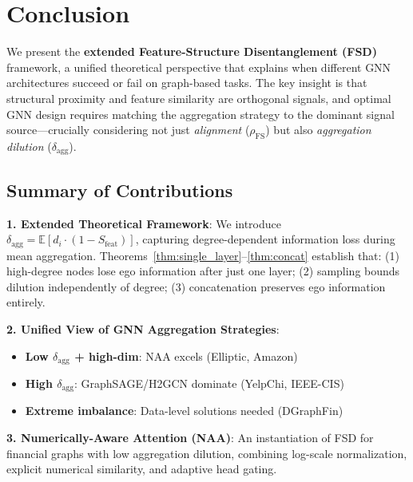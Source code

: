 \section{Conclusion}
\label{sec:conclusion}

We present the \textbf{extended Feature-Structure Disentanglement (FSD)} framework, a unified theoretical perspective that explains when different GNN architectures succeed or fail on graph-based tasks. The key insight is that structural proximity and feature similarity are orthogonal signals, and optimal GNN design requires matching the aggregation strategy to the dominant signal source---crucially considering not just \textit{alignment} ($\rho_{\text{FS}}$) but also \textit{aggregation dilution} ($\delta_{\text{agg}}$).

\subsection{Summary of Contributions}

\textbf{1. Extended Theoretical Framework}: We introduce $\delta_{\text{agg}} = \mathbb{E}[d_i \cdot (1 - S_{\text{feat}})]$, capturing degree-dependent information loss during mean aggregation. Theorems~\ref{thm:single_layer}--\ref{thm:concat} establish that: (1) high-degree nodes lose ego information after just one layer; (2) sampling bounds dilution independently of degree; (3) concatenation preserves ego information entirely.

\textbf{2. Unified View of GNN Aggregation Strategies}:
\begin{itemize}
    \item \textbf{Low $\delta_{\text{agg}}$ + high-dim}: NAA excels (Elliptic, Amazon)
    \item \textbf{High $\delta_{\text{agg}}$}: GraphSAGE/H2GCN dominate (YelpChi, IEEE-CIS)
    \item \textbf{Extreme imbalance}: Data-level solutions needed (DGraphFin)
\end{itemize}

\textbf{3. Numerically-Aware Attention (NAA)}: An instantiation of FSD for financial graphs with low aggregation dilution, combining log-scale normalization, explicit numerical similarity, and adaptive head gating.

